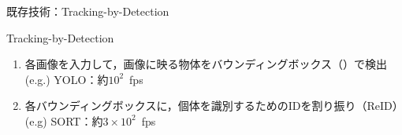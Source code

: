 \begin{frame}{既存技術：Tracking-by-Detection}
    \begin{block}{Tracking-by-Detection \cite{luo2021multiple}}
        \begin{enumerate}
            \item 各画像を入力して，画像に映る物体をバウンディングボックス（\red{$\square$}）で検出
            \\\ra (e.g.) YOLO：約$10^2$\ fps \cite{redmon2016you,wang2024yolov10}
            \item 各バウンディングボックスに，個体を識別するためのIDを割り振り（ReID）
            \\\ra (e.g) SORT：約$3\times10^2$\ fps \cite{bewley2016simple,du2023strongsort}
        \end{enumerate}        
    \end{block}
    \vs
\end{frame}

